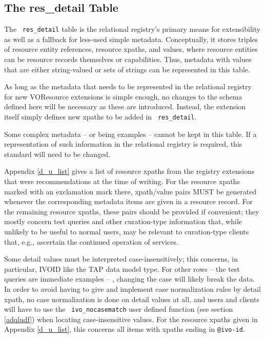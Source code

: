 \documentclass[11pt,a4paper]{ivoa}
\newcommand{\rtent}[1]{\texttt{\color{rtcolor} #1}}
\begin{document}
\subsection{The res\_detail Table}

\label{table_res_detail}

The \rtent{res\_detail} table is the relational registry's primary means for
extensibility as well as a fallback for less-used simple
metadata.  Conceptually, it stores triples of resource entity
references, resource xpaths,
and values, where resource entities can be resource records themselves
or capabilities.  Thus, metadata with values that are either
string-valued or sets of strings can be represented in this table.

As long as the metadata that needs to be represented in the
relational registry for new VOResource extensions is simple enough, no changes to the schema defined
here will be necessary as these are introduced.  Instead, the extension itself simply defines
new xpaths to be added in \rtent{res\_detail}.

Some complex metadata --  or
 being examples -- cannot be kept in this table.
If a representation of such information in the relational registry is
required, this standard will need to be changed.

Appendix \ref{d_u_list} gives a list
of resource xpaths from the registry extensions
that were recommendations at the time of writing.  
For the resource xpaths marked with an exclamation mark there,
xpath/value pairs MUST be generated whenever the corresponding
metadata items are given in a resource record.
For the remaining resource xpaths, these pairs should be provided if
convenient; they mostly concern test queries and other curation-type
information that, while unlikely to be useful to normal users, may be
relevant to curation-type clients that, e.g., ascertain the continued 
operation of services.

Some detail values must be interpreted case-insensitively; this
concerns, in particular, IVOID like the TAP data model type.  For other
rows -- the test queries are immediate examples -- , changing the case
will likely break the data.  In order to avoid having to give and
implement case normalization rules by detail xpath, no case normalization 
is done on detail values at all, and users and clients will have to use
the \rtent{ivo\_nocasematch} user defined function (see section
\ref{adqludf}) when locating
case-insensitive values.  For the resource xpaths given in Appendix \ref{d_u_list}, this concerns all items with xpaths ending
in \texttt{@ivo-id}.
\end{document}
